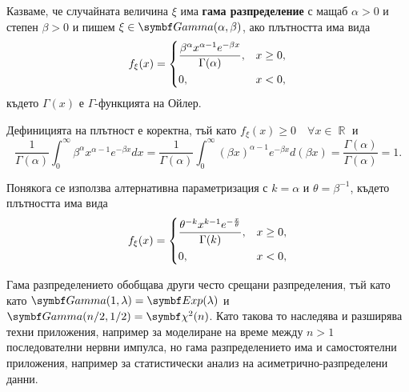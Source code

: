 \documentclass{../../common/topic}
\begin{document}
\begin{definition}
  Казваме, че случайната величина \( \xi \) има \textbf{гама разпределение} с мащаб \( \alpha > 0 \) и степен \( \beta > 0 \) и пишем \( \xi \in \distr{Gamma}(\alpha, \beta) \), ако плътността има вида
  \begin{align*}
    f_\xi(x)
    =
    \begin{dcases}
      \frac {\beta^\alpha x^{\alpha-1} e^{-\beta x}} {\Gamma(\alpha)}, &x \geq 0, \\
      0, &x < 0,
    \end{dcases}
  \end{align*}
  където \( \Gamma(x) \) е \( \Gamma \)-функцията на Ойлер.

  Дефиницията на плътност е коректна, тъй като \( f_\xi(x) \geq 0\quad\forall x \in \BbbR \) и
  \begin{equation*}
    \frac 1 {\Gamma(\alpha)} \int_0^\infty {\beta^\alpha x^{\alpha-1} e^{-\beta x}} dx
    =
    \frac 1 {\Gamma(\alpha)} \int_0^\infty {{(\beta x)}^{\alpha-1} e^{-\beta x}} d(\beta x)
    =
    \frac {\Gamma(\alpha)} {\Gamma(\alpha)}
    =
    1.
  \end{equation*}

  Понякога се използва алтернативна параметризация с \( k = \alpha \) и \( \theta = \beta^{-1} \), където плътността има вида
  \begin{align*}
    f_\xi(x)
    =
    \begin{dcases}
      \frac {\theta^{-k} x^{k-1} e^{-\frac x \theta}} {\Gamma(k)}, &x \geq 0, \\
      0, &x < 0,
    \end{dcases}
  \end{align*}
\end{definition}

Гама разпределението обобщава други често срещани разпределения, тъй като като \( \distr{Gamma}(1, \lambda) = \distr{Exp}(\lambda) \) и \( \distr{Gamma}(n/2, 1/2) = \distr{\chi^2}(n) \). Като такова то наследява и разширява техни приложения, например за моделиране на време между \( n > 1 \) последователни нервни импулса, но гама разпределението има и самостоятелни приложения, например за статистически анализ на асиметрично-разпределени данни.
\end{document}

